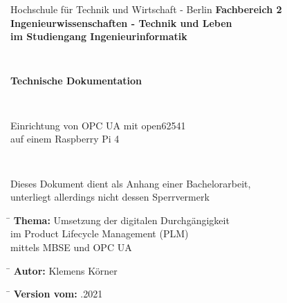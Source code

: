 \documentclass[a4paper,12pt]{article}
\begin{document}
\thispagestyle{empty}

\begin{verbatim}
\end{verbatim}
\begin{center}
	\doublespacing
	\LARGE{Hochschule für Technik und Wirtschaft - Berlin}
	\singlespacing
	\textbf{\Large{Fachbereich 2\\  Ingenieurwissenschaften - Technik und Leben \\im Studiengang Ingenieurinformatik}}
\end{center}
\begin{verbatim}
	
\end{verbatim}
\begin{center}
	\doublespacing
	\textbf{\Large{Technische Dokumentation}}\\
	\singlespacing
\end{center}
\begin{verbatim}
	
\end{verbatim}
\begin{center}
	\Large{Einrichtung von OPC UA mit open62541} 	\\
	\Large{auf einem Raspberry Pi 4}\\
\end{center}
\begin{verbatim}
	
\end{verbatim}
\begin{center}
	Dieses Dokument dient als Anhang einer Bachelorarbeit, \\ unterliegt allerdings nicht dessen Sperrvermerk
\end{center} 
\begin{tabbing}
	\hspace{5cm}\=\kill
	\textbf{Thema:}	\> Umsetzung der digitalen Durchgängigkeit \\ \> im Product   Lifecycle Management   (PLM) \\ \> mittels MBSE und OPC UA
\end{tabbing} 
\begin{tabbing}
	\hspace{5cm}\=\kill
	\textbf{Autor:}	\> Klemens Körner
\end{tabbing} 
\begin{tabbing}
	\hspace{5cm}\=\kill
	\textbf{Version vom:}	.2021
\end{tabbing} 
\clearpage
\end{document}
